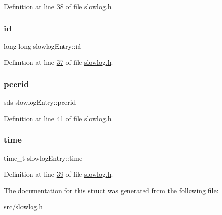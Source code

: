 Definition at line \hyperlink{slowlog_8h_source_l00038}{38} of file \hyperlink{slowlog_8h_source}{slowlog.\+h}.

\mbox{\label{structslowlogEntry_aa912ab62fa7a75f5281c5e309ca2b321}} 
\subsubsection{\texorpdfstring{id}{id}}
{\footnotesize\ttfamily long long slowlog\+Entry\+::id}



Definition at line \hyperlink{slowlog_8h_source_l00037}{37} of file \hyperlink{slowlog_8h_source}{slowlog.\+h}.

\mbox{\label{structslowlogEntry_a05277f849959d59ec11b827783fc6eee}} 
\subsubsection{\texorpdfstring{peerid}{peerid}}
{\footnotesize\ttfamily sds slowlog\+Entry\+::peerid}



Definition at line \hyperlink{slowlog_8h_source_l00041}{41} of file \hyperlink{slowlog_8h_source}{slowlog.\+h}.

\mbox{\label{structslowlogEntry_a8154951a07692c713b23905c5f7c6cec}} 
\subsubsection{\texorpdfstring{time}{time}}
{\footnotesize\ttfamily time\+\_\+t slowlog\+Entry\+::time}



Definition at line \hyperlink{slowlog_8h_source_l00039}{39} of file \hyperlink{slowlog_8h_source}{slowlog.\+h}.



The documentation for this struct was generated from the following file\+:\begin{DoxyCompactItemize}
\item 
src/slowlog.\+h\end{DoxyCompactItemize}
